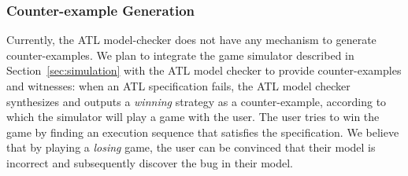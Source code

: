 \subsubsection{Counter-example Generation}
Currently, the ATL model-checker does not have any mechanism to generate
counter-examples. We plan to integrate the game simulator described in
Section~\ref{sec:simulation} with the ATL model checker to provide
counter-examples and witnesses: when an ATL specification fails, the ATL
model checker synthesizes and outputs a {\em winning} strategy as a
counter-example, according to which the simulator will play a game with the
user.  The user tries to win the game by finding an execution sequence that
satisfies the specification.  We believe that by playing a {\em losing}
game, the user can be convinced that their model is incorrect and
subsequently discover the bug in their model.


